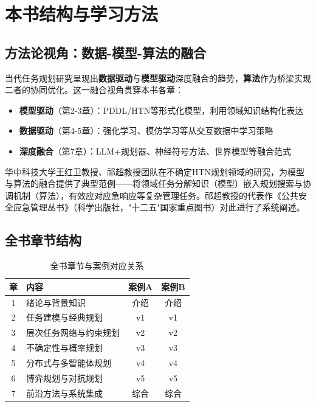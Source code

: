 \section{本书结构与学习方法}

\subsection{方法论视角：数据-模型-算法的融合}

当代任务规划研究呈现出\textbf{数据驱动}与\textbf{模型驱动}深度融合的趋势，\textbf{算法}作为桥梁实现二者的协同优化。这一融合视角贯穿本书各章：

\begin{itemize}[leftmargin=2em]
  \item \textbf{模型驱动}（第2-3章）：PDDL/HTN等形式化模型，利用领域知识结构化表达
  \item \textbf{数据驱动}（第4-5章）：强化学习、模仿学习等从交互数据中学习策略
  \item \textbf{深度融合}（第7章）：LLM+规划器、神经符号方法、世界模型等融合范式
\end{itemize}

华中科技大学王红卫教授、祁超教授团队在不确定HTN规划领域的研究，为模型与算法的融合提供了典型范例——将领域任务分解知识（模型）嵌入规划搜索与协调机制（算法），有效应对应急响应等复杂管理任务。祁超教授的代表作《公共安全应急管理丛书》（科学出版社，"十二五"国家重点图书）对此进行了系统阐述。

\subsection{全书章节结构}

\begin{table}[htbp]
\centering
\caption{全书章节与案例对应关系}
\begin{tabular}{clcc}
\toprule
\textbf{章} & \textbf{内容} & \textbf{案例A} & \textbf{案例B} \\
\midrule
1 & 绪论与背景知识 & 介绍 & 介绍 \\
2 & 任务建模与经典规划 & v1 & v1 \\
3 & 层次任务网络与约束规划 & v2 & v2 \\
4 & 不确定性与概率规划 & v3 & v3 \\
5 & 分布式与多智能体规划 & v4 & v4 \\
6 & 博弈规划与对抗规划 & v5 & v5 \\
7 & 前沿方法与系统集成 & 综合 & 综合 \\
\bottomrule
\end{tabular}
\end{table}

